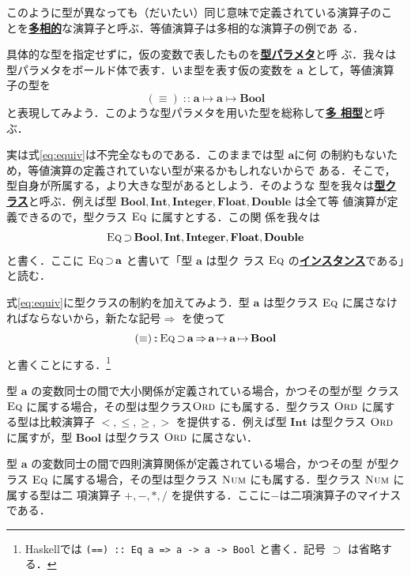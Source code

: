\documentclass[a5paper,twoside,fleqn,draft]{jsbook}
\newcommand{\programminglanguage}[1]{\textsf{#1}}
\newcommand{\haskell}{\programminglanguage{Haskell}}
\newcommand{\keyword}[1]{{\underline{\textbf{#1}}}}
\newcommand{\code}[1]{\texttt{#1}}
\DeclareMathOperator{\mSuperClass}{\Rightarrow}
\DeclareMathOperator{\mSuperSet}{\supset}
\DeclareMathOperator{\mFuncArrow}{\mapsto}
\DeclareMathOperator{\mIn}{{:\!:}}
\newcommand{\mType}[1]{\mathbf{#1}} %
\newcommand{\mA}{\mType{a}}
\newcommand{\mBoolType}{\mType{Bool}}
\newcommand{\mFloatType}{\mType{Float}}
\newcommand{\mDoubleType}{\mType{Double}}
\newcommand{\mIntType}{\mType{Int}}
\newcommand{\mIntegerType}{\mType{Integer}}
\newcommand{\mTypeClass}[1]{\textsc{#1}} %
\newcommand{\mEqTypeClass}{\mTypeClass{Eq}}
\newcommand{\mNumTypeClass}{\mTypeClass{Num}}
\newcommand{\mOrdTypeClass}{\mTypeClass{Ord}}
\begin{document}
このように型が異なっても（だいたい）同じ意味で定義されている演算子のこ
とを\keyword{多相的}な演算子と呼ぶ．等値演算子は多相的な演算子の例であ
る．

具体的な型を指定せずに，仮の変数で表したものを\keyword{型パラメタ}と呼
ぶ．我々は型パラメタをボールド体で表す．いま型を表す仮の変数を
$\mA $ として，等値演算子の型を
\begin{equation}
  \label{eq:equiv}
  (\equiv)
  \mIn\mA\mFuncArrow\mA\mFuncArrow\mBoolType
\end{equation}
と表現してみよう．このような型パラメタを用いた型を総称して\keyword{多
  相型}と呼ぶ．

実は式\eqref{eq:equiv}は不完全なものである．このままでは型 $\mA $に何
の制約もないため，等値演算の定義されていない型が来るかもしれないからで
ある．そこで，型自身が所属する，より大きな型があるとしよう．そのような
型を我々は\keyword{型クラス}と呼ぶ．例えば型
$\mBoolType,\mIntType,\mIntegerType,\mFloatType,\mDoubleType$ は全て等
値演算が定義できるので，型クラス $\mEqTypeClass$ に属すとする．この関
係を我々は
\begin{equation}
  \mEqTypeClass
  \mSuperSet\mBoolType,\mIntType,\mIntegerType,\mFloatType,\mDoubleType
\end{equation}
と書く．ここに $\mEqTypeClass\mSuperSet\mA$ と書いて「型 $\mA$ は型ク
  ラス $\mEqTypeClass$ の\keyword{インスタンス}である」と読む．

式\eqref{eq:equiv}に型クラスの制約を加えてみよう．型 $\mA$ は型クラス
$\mEqTypeClass$ に属さなければならないから，新たな記号$\mSuperClass$
を使って
\begin{equation}
  (\equiv)
  \mIn{}\mEqTypeClass\mSuperSet\mA
  \mSuperClass\mA\mFuncArrow\mA\mFuncArrow\mBoolType
\end{equation}
と書くことにする．\footnote{\haskell では \code{(==) :: Eq a => a -> a
    -> Bool} と書く．記号 $\mSuperSet$ は省略する．}

型 $\mA$ の変数同士の間で大小関係が定義されている場合，かつその型が型
クラス $\mEqTypeClass$ に属する場合，その型は型クラス$\mOrdTypeClass$
にも属する．型クラス $\mOrdTypeClass$ に属する型は比較演算子
$<,\le,\ge,>$ を提供する．例えば型 $\mIntType$ は型クラス
$\mOrdTypeClass$ に属すが，型 $\mBoolType$ は型クラス $\mOrdTypeClass$
に属さない．

型 $\mA$ の変数同士の間で四則演算関係が定義されている場合，かつその型
が型クラス $\mEqTypeClass$ に属する場合，その型は型クラス
$\mNumTypeClass$ にも属する．型クラス $\mNumTypeClass$ に属する型は二
項演算子 $+,-,*,/$ を提供する．ここに$-$は二項演算子のマイナスである．
\end{document}

